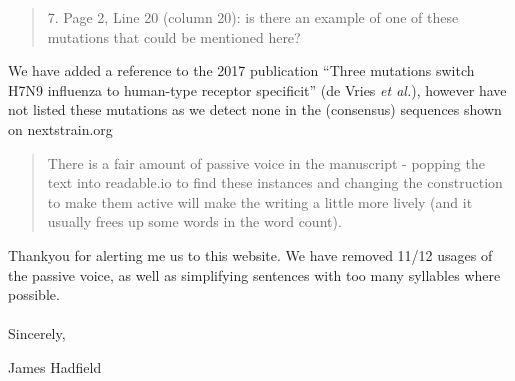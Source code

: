 \documentclass[12pt,a4paper]{article}
\begin{document}
\begin{quote}
7. Page 2, Line 20 (column 20): is there an example of one of these mutations that could be mentioned here?
\end{quote}
We have added a reference to the 2017 publication ``Three mutations switch H7N9 influenza to human-type receptor specificit'' (de Vries \textit{et al.}), however have not listed these mutations as we detect none in the (consensus) sequences shown on nextstrain.org

\begin{quote}
There is a fair amount of passive voice in the manuscript - popping the text into readable.io to find these instances and changing the construction to make them active will make the writing a little more lively (and it usually frees up some words in the word count).
\end{quote}
Thankyou for alerting me us to this website. We have removed 11/12 usages of the passive voice, as well as simplifying sentences with too many syllables where possible. 

\paragraph{}
Sincerely,

James Hadfield
\end{document}

